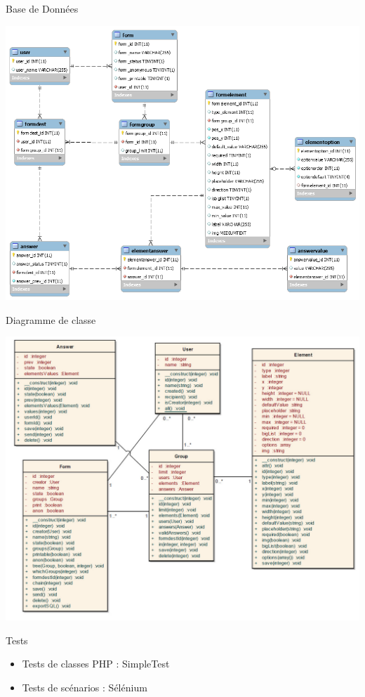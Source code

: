 \documentclass[11pt]{beamer}
\begin{document}
\begin{frame}{Base de Données}
\begin{center}
\includegraphics[width=.7\paperwidth]{images/bdd_diagram.png}
\end{center}
\end{frame}

\begin{frame}{Diagramme de classe}
\begin{center}
\includegraphics[width=.7\paperwidth]{images/class_diagram.jpg}
\end{center}
\end{frame}

\begin{frame}{Tests}
\begin{itemize}
	\item Tests de classes PHP : SimpleTest
	\item Tests de scénarios : Sélénium
\end{itemize}
\end{frame}
\end{document}
